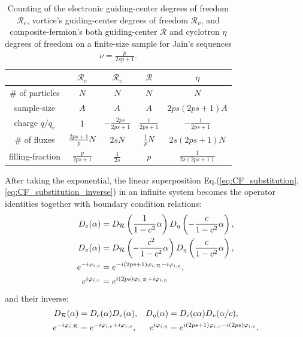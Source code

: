 \begin{table}
\centering
\begin{tabular}{||c | c | c | c | c||} 
 \hline
  & $\mathcal R_e$ & $\mathcal R_v$ & $\mathcal R$ & $\eta$ \\ 
 \hline\hline
 \# of particles & $N$ & $N$ & $N$ & $N$ \\ \hline
 sample-size & $A$ & $A$ & $A$ & $2ps(2ps+1) A$\\\hline
 charge $q/q_e$ & 1 & $-\frac{2ps}{2ps+1}$ & $\frac{1}{2ps+1}$ & $-\frac{1}{2ps+1}$\\ \hline
 \# of fluxes & $\frac{2ps+1}{p} N$ & $2s N$  & $\frac{1}{p} N $ & $2s(2ps+1) N$ \\ \hline
 filling-fraction & $\frac{p}{2ps+1}$ & $\frac{1}{2s}$ & $p$ & $\frac{1}{2s(2ps+1)}$ \\ \hline
 \hline
\end{tabular}
\caption{Counting of the electronic guiding-center degrees of freedom $\mathcal R_e$, vortice's guiding-center degrees of freedom $\mathcal R_v$, and composite-fermion's both guiding-center $\mathcal R$ and cyclotron $\eta$ degrees of freedom on a finite-size sample for Jain's sequences $\nu=\frac{p}{2sp+1}$.}
\label{tb:dimensions}
\end{table}

After taking the exponential, the linear superposition Eq.(\ref{eq:CF_substitution},\ref{eq:CF_substitution_inverse}) in an infinite system becomes the operator identities together with boundary condition relations:
\begin{align}
D_e(\alpha)&=D_{\mathcal R}\left(\frac{1}{1-c^2}\alpha\right) D_{\eta}\left(-\frac{c}{1-c^2}\alpha\right),\notag\\
D_v(\alpha)&=D_{\mathcal R}\left(-\frac{c^2}{1-c^2}\alpha\right) D_{\eta}\left(\frac{c}{1-c^2}\alpha\right),\notag\\
e^{-i\varphi_{i,e}}&=e^{-i(2ps+1)\varphi_{i,\mathcal R}-i\varphi_{i,\eta}},\notag\\ e^{i\varphi_{i,v}}&=e^{i(2ps)\varphi_{i,\mathcal R}+i\varphi_{i,\eta}}\label{eq:D_e_D_v_to_D_R_D_eta}
\end{align}
and their inverse:
\begin{align}
D_{\mathcal R}(\alpha)&=D_e(\alpha)D_v(\alpha),& D_{\eta}(\alpha)&=D_e(c\alpha)D_v(\alpha/c),\notag\\
e^{-i\varphi_{i,\mathcal R}}&=e^{-i\varphi_{i,e}+i\varphi_{i,v}},& e^{i\varphi_{i,\eta}}&=e^{i(2ps+1)\varphi_{i,v}-i(2ps)\varphi_{i,e}}.\label{eq:D_R_D_eta_to_D_e_D_v}
\end{align}

